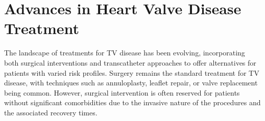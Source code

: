 \section{Advances in Heart Valve Disease Treatment}
The landscape of treatments for \gls{TV} disease has been evolving, incorporating both surgical interventions and transcatheter approaches to offer alternatives for patients with varied risk profiles. Surgery remains the standard treatment for \gls{TV} disease, with techniques such as annuloplasty, leaflet repair, or valve replacement being common. However, surgical intervention is often reserved for patients without significant comorbidities due to the invasive nature of the procedures and the associated recovery times.

